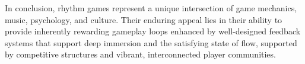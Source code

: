 In conclusion, rhythm games represent a unique intersection of game mechanics, music, psychology, and culture. Their enduring appeal lies in their ability to provide inherently rewarding gameplay loops enhanced by well-designed feedback systems that support deep immersion and the satisfying state of flow, supported by competitive structures and vibrant, interconnected player communities.
